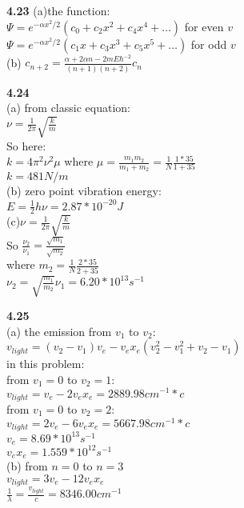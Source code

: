 \documentclass{article}
\begin{document}
\textbf{4.23}
(a)the function:\\
$\Psi = e^{-\alpha x^2 / 2}(c_0+c_2x^2+c_4x^4+\dots)$ for even $v$\\
$\Psi = e^{-\alpha x^2 / 2}(c_1x+c_3x^3+c_5x^5+\dots)$ for odd $v$\\
(b) $c_{n+2} = \frac{\alpha+2\alpha n - 2mE\hbar^{-2}}{(n+1)(n+2)}c_n$\\
\newline

\textbf{4.24}\\
(a) from classic equation:\\
$\nu = \frac{1}{2\pi}\sqrt{\frac{k}{m}}$\\
So here:\\
$k = 4\pi^2\nu^2\mu$
where $\mu = \frac{m_1m_2}{m_1+m_2} = \frac{1}{N}\frac{1*35}{1+35}$\\
$k=481N/m$\\
(b) zero point vibration energy:\\
$E = \frac{1}{2}h\nu = 2.87*10^{-20}J$\\
(c)$\nu = \frac{1}{2\pi}\sqrt{\frac{k}{m}}$\\
So $\frac{\nu_2}{\nu_1} = \frac{\sqrt{m_1}}{\sqrt{m_2}}$\\
where $m_2 = \frac{1}{N}\frac{2*35}{2+35}$\\
$\nu_2 = \sqrt{\frac{m_1}{m_2}}\nu_1 = 6.20*10^{13}s^{-1}$\\
\newline

\textbf{4.25}\\
(a) the emission from $v_1$ to $v_2$:\\
$v_{light} = (v_2-v_1)v_e - v_ex_e(v_2^2 - v_1^2+v_2 - v_1)$\\
in this problem:\\
from $v_1 = 0$ to $v_2 = 1$:\\
$v_{light}= v_e - 2v_ex_e = 2889.98cm^{-1} * c$\\
from $v_1 = 0$ to $v_2 = 2$:\\
$v_{light} = 2v_e - 6v_ex_e = 5667.98cm^{-1} * c$\\
$v_e = 8.69*10^{13}s^{-1}$\\
$v_ex_e = 1.559*10^{12}s^{-1}$\\
(b) from $n = 0$ to $n = 3$\\
$v_{light} = 3v_e - 12v_ex_e$\\
$\frac{1}{\lambda} = \frac{v_{light}}{c} = 8346.00 cm^{-1}$\\
\newline
\end{document}
